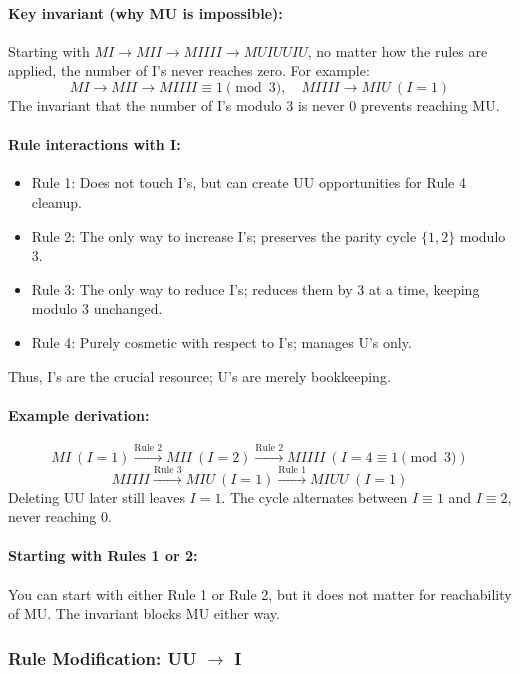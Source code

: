 \documentclass{article}
\theoremstyle{theorem}
\theoremstyle{definition}
\theoremstyle{remark}
\begin{document}
\paragraph{Key invariant (why MU is impossible):}  
Starting with $MI \to MII \to MIIII \to MUIUUIU$, no matter how the rules are applied, the number of I’s never reaches zero. For example:
\[
MI \to MII \to MIIII \equiv 1 \pmod{3}, \quad 
MIIII \to MIU \ (I=1)
\]
The invariant that the number of I’s modulo 3 is never 0 prevents reaching MU.

\paragraph{Rule interactions with I:}
\begin{itemize}
  \item Rule 1: Does not touch I’s, but can create UU opportunities for Rule 4 cleanup.
  \item Rule 2: The only way to increase I’s; preserves the parity cycle $\{1,2\}$ modulo 3.
  \item Rule 3: The only way to reduce I’s; reduces them by 3 at a time, keeping modulo 3 unchanged.
  \item Rule 4: Purely cosmetic with respect to I’s; manages U’s only.
\end{itemize}
Thus, I’s are the crucial resource; U’s are merely bookkeeping.

\paragraph{Example derivation:}
\[
MI \ (I=1) \xrightarrow{\text{Rule 2}} MII \ (I=2) \xrightarrow{\text{Rule 2}} MIIII \ (I=4 \equiv 1 \pmod{3})
\]
\[
MIIII \xrightarrow{\text{Rule 3}} MIU \ (I=1) \xrightarrow{\text{Rule 1}} MIUU \ (I=1)
\]
Deleting UU later still leaves $I=1$. The cycle alternates between $I \equiv 1$ and $I \equiv 2$, never reaching 0.

\paragraph{Starting with Rules 1 or 2:}  
You can start with either Rule 1 or Rule 2, but it does not matter for reachability of MU. The invariant blocks MU either way.

\subsubsection{Rule Modification: UU $\to$ I}
\end{document}
